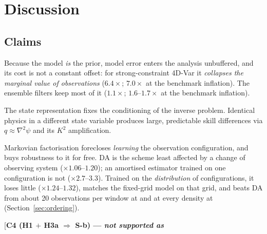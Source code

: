 \section{Discussion}
\label{sec:discussion}

\subsection{Claims}
\label{sec:claims}

\begin{description}[leftmargin=2.2em,style=nextline]
  \item[\textbf{C1 (H2, headline).}]
    Because the model \emph{is} the prior, model error enters the analysis
    unbuffered, and its cost is not a constant offset: for strong-constraint
    4D-Var it \emph{collapses the marginal value of observations} ($6.4\times$;
    $7.0\times$ at the benchmark inflation). The ensemble filters keep most of it
    ($1.1\times$; $1.6$--$1.7\times$ at the benchmark inflation).
  \item[\textbf{C2 (H3a).}]
    The state representation fixes the conditioning of the inverse problem.
    Identical physics in a different state variable produces large, predictable
    skill differences via $q\approx\nabla^2\psi$ and its $K^2$ amplification.
  \item[\textbf{C3 (H1).}]
    Markovian factorisation forecloses \emph{learning} the observation
    configuration, and buys robustness to it for free. DA is the scheme least
    affected by a change of observing system ($\times 1.06$--$1.20$); an amortised
    estimator trained on one configuration is not ($\times 2.7$--$3.3$). Trained on
    the \emph{distribution} of configurations, it loses little
    ($\times 1.24$--$1.32$), matches the fixed-grid model on that grid, and beats DA
    from about 20 observations per window at \Sz{} and at every density at \So{}
    (Section~\ref{sec:ordering}).
  \item[\textbf{C4 (H1 $+$ H3a $\Rightarrow$ S-b) --- \emph{not supported as
}}
\end{description}
